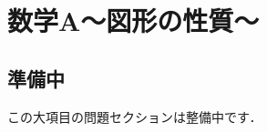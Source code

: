 \documentclass[../../ms_q.tex]{subfiles}
\begin{document}
\section{数学A～図形の性質～}

\subsection*{準備中}
この大項目の問題セクションは整備中です．
\end{document}
